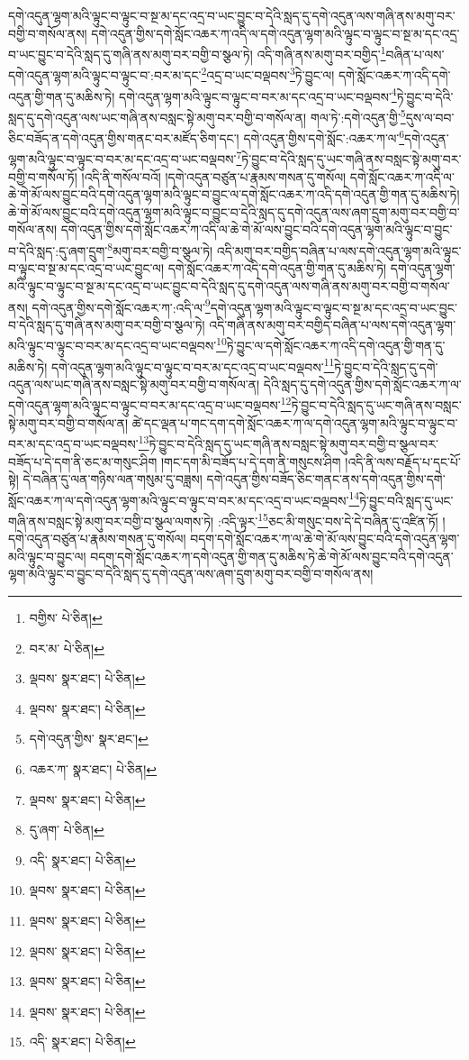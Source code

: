 དགེ་འདུན་ལྷག་མའི་ལྟུང་བ་ལྟུང་བ་སྔ་མ་དང་འདྲ་བ་ཡང་བྱུང་བ་དེའི་སླད་དུ་དགེ་འདུན་ལས་གཞི་ནས་མགུ་བར་བགྱི་བ་གསོལ་ནས། དགེ་འདུན་གྱིས་དགེ་སློང་འཆར་ཀ་འདི་ལ་དགེ་འདུན་ལྷག་མའི་ལྟུང་བ་ལྟུང་བ་སྔ་མ་དང་འདྲ་བ་ཡང་བྱུང་བ་དེའི་སླད་དུ་གཞི་ནས་མགུ་བར་བགྱི་བ་སྩལ་ཏེ། འདི་གཞི་ནས་མགུ་བར་བགྱིད་\footnote{བགྱིས་  པེ་ཅིན། }བཞིན་པ་ལས་དགེ་འདུན་ལྷག་མའི་ལྟུང་བ་ལྟུང་བ་:བར་མ་དང་\footnote{བར་མ་  པེ་ཅིན། }འདྲ་བ་ཡང་བལྡབས་\footnote{ལྡབས་  སྣར་ཐང་།  པེ་ཅིན། }ཏེ་བྱུང་ལ། དགེ་སློང་འཆར་ཀ་འདི་དགེ་འདུན་གྱི་གན་དུ་མཆིས་ཏེ། དགེ་འདུན་ལྷག་མའི་ལྟུང་བ་ལྟུང་བ་བར་མ་དང་འདྲ་བ་ཡང་བལྡབས་\footnote{ལྡབས་  སྣར་ཐང་།  པེ་ཅིན། }ཏེ་བྱུང་བ་དེའི་སླད་དུ་དགེ་འདུན་ལས་ཡང་གཞི་ནས་བསླང་སྟེ་མགུ་བར་བགྱི་བ་གསོལ་ན། གལ་ཏེ་:དགེ་འདུན་གྱི་\footnote{དགེ་འདུན་གྱིས་  སྣར་ཐང་། }དུས་ལ་བབ་ཅིང་བཟོད་ན་དགེ་འདུན་གྱིས་གནང་བར་མཛོད་ཅིག་དང་། དགེ་འདུན་གྱིས་དགེ་སློང་:འཆར་ཀ་ལ་\footnote{འཆར་ཀ་  སྣར་ཐང་།  པེ་ཅིན། }དགེ་འདུན་ལྷག་མའི་ལྟུང་བ་ལྟུང་བ་བར་མ་དང་འདྲ་བ་ཡང་བལྡབས་\footnote{ལྡབས་  སྣར་ཐང་།  པེ་ཅིན། }ཏེ་བྱུང་བ་དེའི་སླད་དུ་ཡང་གཞི་ནས་བསླང་སྟེ་མགུ་བར་བགྱི་བ་གསོལ་ཏོ། །འདི་ནི་གསོལ་བའོ། །དགེ་འདུན་བཙུན་པ་རྣམས་གསན་དུ་གསོལ། དགེ་སློང་འཆར་ཀ་འདི་ལ་ཆེ་གེ་མོ་ལས་བྱུང་བའི་དགེ་འདུན་ལྷག་མའི་ལྟུང་བ་བྱུང་ལ་དགེ་སློང་འཆར་ཀ་འདི་དགེ་འདུན་གྱི་གན་དུ་མཆིས་ཏེ། ཆེ་གེ་མོ་ལས་བྱུང་བའི་དགེ་འདུན་ལྷག་མའི་ལྟུང་བ་བྱུང་བ་དེའི་སླད་དུ་དགེ་འདུན་ལས་ཞག་དྲུག་མགུ་བར་བགྱི་བ་གསོལ་ནས། དགེ་འདུན་གྱིས་དགེ་སློང་འཆར་ཀ་འདི་ལ་ཆེ་གེ་མོ་ལས་བྱུང་བའི་དགེ་འདུན་ལྷག་མའི་ལྟུང་བ་བྱུང་བ་དེའི་སླད་:དུ་ཞག་དྲུག་\footnote{དུ་ཞག་  པེ་ཅིན། }མགུ་བར་བགྱི་བ་སྩལ་ཏེ། འདི་མགུ་བར་བགྱིད་བཞིན་པ་ལས་དགེ་འདུན་ལྷག་མའི་ལྟུང་བ་ལྟུང་བ་སྔ་མ་དང་འདྲ་བ་ཡང་བྱུང་ལ། དགེ་སློང་འཆར་ཀ་འདི་དགེ་འདུན་གྱི་གན་དུ་མཆིས་ཏེ། དགེ་འདུན་ལྷག་མའི་ལྟུང་བ་ལྟུང་བ་སྔ་མ་དང་འདྲ་བ་ཡང་བྱུང་བ་དེའི་སླད་དུ་དགེ་འདུན་ལས་གཞི་ནས་མགུ་བར་བགྱི་བ་གསོལ་ནས། དགེ་འདུན་གྱིས་དགེ་སློང་འཆར་ཀ་:འདི་ལ་\footnote{འདི་  སྣར་ཐང་།  པེ་ཅིན། }དགེ་འདུན་ལྷག་མའི་ལྟུང་བ་ལྟུང་བ་སྔ་མ་དང་འདྲ་བ་ཡང་བྱུང་བ་དེའི་སླད་དུ་གཞི་ནས་མགུ་བར་བགྱི་བ་སྩལ་ཏེ། འདི་གཞི་ནས་མགུ་བར་བགྱིད་བཞིན་པ་ལས་དགེ་འདུན་ལྷག་མའི་ལྟུང་བ་ལྟུང་བ་བར་མ་དང་འདྲ་བ་ཡང་བལྡབས་\footnote{ལྡབས་  སྣར་ཐང་།  པེ་ཅིན། }ཏེ་བྱུང་ལ་དགེ་སློང་འཆར་ཀ་འདི་དགེ་འདུན་གྱི་གན་དུ་མཆིས་ཏེ། དགེ་འདུན་ལྷག་མའི་ལྟུང་བ་ལྟུང་བ་བར་མ་དང་འདྲ་བ་ཡང་བལྡབས་\footnote{ལྡབས་  སྣར་ཐང་།  པེ་ཅིན། }ཏེ་བྱུང་བ་དེའི་སླད་དུ་དགེ་འདུན་ལས་ཡང་གཞི་ནས་བསླང་སྟེ་མགུ་བར་བགྱི་བ་གསོལ་ན། དེའི་སླད་དུ་དགེ་འདུན་གྱིས་དགེ་སློང་འཆར་ཀ་ལ་དགེ་འདུན་ལྷག་མའི་ལྟུང་བ་ལྟུང་བ་བར་མ་དང་འདྲ་བ་ཡང་བལྡབས་\footnote{ལྡབས་  སྣར་ཐང་།  པེ་ཅིན། }ཏེ་བྱུང་བ་དེའི་སླད་དུ་ཡང་གཞི་ནས་བསླང་སྟེ་མགུ་བར་བགྱི་བ་གསོལ་ན། ཚེ་དང་ལྡན་པ་གང་དག་དགེ་སློང་འཆར་ཀ་ལ་དགེ་འདུན་ལྷག་མའི་ལྟུང་བ་ལྟུང་བ་བར་མ་དང་འདྲ་བ་ཡང་བལྡབས་\footnote{ལྡབས་  སྣར་ཐང་།  པེ་ཅིན། }ཏེ་བྱུང་བ་དེའི་སླད་དུ་ཡང་གཞི་ནས་བསླང་སྟེ་མགུ་བར་བགྱི་བ་སྩལ་བར་བཟོད་པ་དེ་དག་ནི་ཅང་མ་གསུང་ཤིག །གང་དག་མི་བཟོད་པ་དེ་དག་ནི་གསུངས་ཤིག །འདི་ནི་ལས་བརྗོད་པ་དང་པོ་སྟེ། དེ་བཞིན་དུ་ལན་གཉིས་ལན་གསུམ་དུ་བཟླས། དགེ་འདུན་གྱིས་བཟོད་ཅིང་གནང་ནས་དགེ་འདུན་གྱིས་དགེ་སློང་འཆར་ཀ་ལ་དགེ་འདུན་ལྷག་མའི་ལྟུང་བ་ལྟུང་བ་བར་མ་དང་འདྲ་བ་ཡང་བལྡབས་\footnote{ལྡབས་  སྣར་ཐང་།  པེ་ཅིན། }ཏེ་བྱུང་བའི་སླད་དུ་ཡང་གཞི་ནས་བསླང་སྟེ་མགུ་བར་བགྱི་བ་སྩལ་ལགས་ཏེ། :འདི་ལྟར་\footnote{འདི་  སྣར་ཐང་།  པེ་ཅིན། }ཅང་མི་གསུང་བས་དེ་དེ་བཞིན་དུ་འཛིན་ཏོ། །དགེ་འདུན་བཙུན་པ་རྣམས་གསན་དུ་གསོལ། བདག་དགེ་སློང་འཆར་ཀ་ལ་ཆེ་གེ་མོ་ལས་བྱུང་བའི་དགེ་འདུན་ལྷག་མའི་ལྟུང་བ་བྱུང་ལ། བདག་དགེ་སློང་འཆར་ཀ་དགེ་འདུན་གྱི་གན་དུ་མཆིས་ཏེ་ཆེ་གེ་མོ་ལས་བྱུང་བའི་དགེ་འདུན་ལྷག་མའི་ལྟུང་བ་བྱུང་བ་དེའི་སླད་དུ་དགེ་འདུན་ལས་ཞག་དྲུག་མགུ་བར་བགྱི་བ་གསོལ་ནས། 